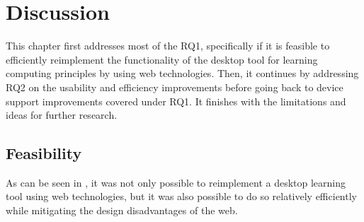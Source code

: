 \chapter{Discussion}
\label{Discussion}

This chapter first addresses most of the RQ1, specifically if it is feasible to efficiently reimplement the functionality of the desktop tool for learning computing principles by using web technologies.
Then, it continues by addressing RQ2 on the usability and efficiency improvements before going back to device support improvements covered under RQ1.
It finishes with the limitations and ideas for further research.

\section{Feasibility}

As can be seen in , it was not only possible to reimplement a desktop learning tool using web technologies, but it was also possible to do so relatively efficiently while mitigating the design disadvantages of the web.


